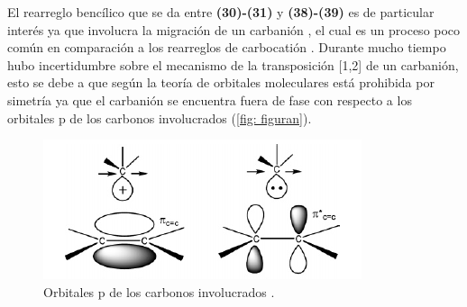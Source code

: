 \documentclass[fleqn,10pt]{SelfArx}
\begin{document}
El rearreglo bencílico que se da entre \textbf{(30)-(31)} y \textbf{(38)-(39)} es de particular interés ya que involucra la migración de un carbanión , el cual es un proceso poco común en comparación a los rearreglos de carbocatión \cite{comisar2007}. Durante mucho tiempo hubo incertidumbre sobre el mecanismo de la transposición [1,2] de un carbanión, esto se debe a que según la teoría de orbitales moleculares está prohibida por simetría ya que el carbanión se encuentra fuera de fase con respecto a los orbitales p de los carbonos involucrados \cite{yamabe2006}\cite{burke2007} (\autoref{fig: figuran}).
\begin{figure}[h]
	\centering
	\includegraphics[width=\linewidth]{figuran.png}
	\caption{Orbitales p de los carbonos involucrados \cite{yamabe2006}.}
	\label{fig: figuran}
\end{figure}
\end{document}
